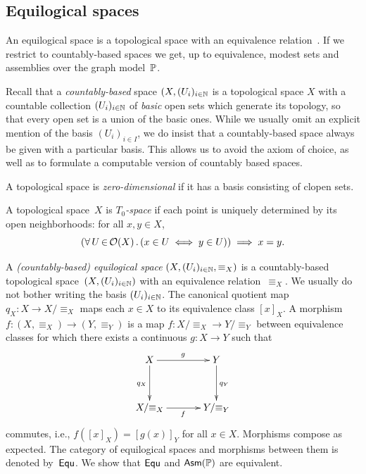 \subsection{Equilogical spaces}
\label{sec:equilogical-spaces}


An equilogical space is a topological space with an
equivalence relation~\cite{BauerA:equs}. If we restrict to
countably-based spaces we get, up to equivalence, modest sets and
assemblies over the graph model~$\mathbb{P}$.

Recall that a \emph{countably-based} space $(X, (U_i)_{i \in \mathbb{N}}$ is
a topological space $X$ with a countable collection $(U_i)_{i \in
  \mathbb{N}}$ of \emph{basic} open sets which generate its topology, so that
every open set is a union of the basic ones. While we usually omit an
explicit mention of the basis $(U_i)_{i \in I}$, we do insist that a
countably-based space always be given with a particular basis. This
allows us to avoid the axiom of choice, as well as to formulate a
computable version of countably based spaces.

A topological space is \emph{zero-dimensional} if it has a basis
consisting of clopen sets.

A topological space~$X$ is \emph{$T_0$-space} if each point is
uniquely determined by its open neighborhoods: for all $x, y \in
X$,
%
\begin{equation*}
  (\forall\, U \,{\in}\, \mathcal{O}(X)\,.\left(x \in U \iff y \in U\right)) \implies x = y.
\end{equation*}

A \emph{(countably-based) equilogical space} $(X, (U_i)_{i \in \mathbb{N}},
{\equiv_X})$ is a countably-based topological space~$(X, (U_i)_{i \in
  \mathbb{N}})$ with an equivalence relation~$\equiv_X$. We usually do not
bother writing the basis $(U_i)_{i \in \mathbb{N}}$. The canonical quotient
map $q_X : X \to X/{\equiv_X}$ maps each $x \in X$ to its equivalence
class $[x]_X$. A morphism $f : (X,{\equiv_X}) \to (Y,{\equiv_Y})$ is a
map $f : X/{\equiv_X} \to Y/{\equiv_Y}$ between equivalence classes
for which there exists a continuous $g : X \to Y$ such that
%
\begin{equation*}
  \xymatrix@+1em{
    {X} \ar[d]_{q_X} \ar[r]^g
    &
    {Y} \ar[d]^{q_Y}
    \\
    {X/{\equiv_X}}
    \ar[r]_f
    &
    {Y/{\equiv_Y}}
  }
\end{equation*}
%
commutes, i.e., $f([x]_X) = [g(x)]_Y$ for all $x \in X$. Morphisms
compose as expected. The category of equilogical spaces and morphisms
between them is denoted by~$\mathsf{Equ}$. We show that $\mathsf{Equ}$ and
$\mathsf{Asm}(\mathbb{P})$ are equivalent.

